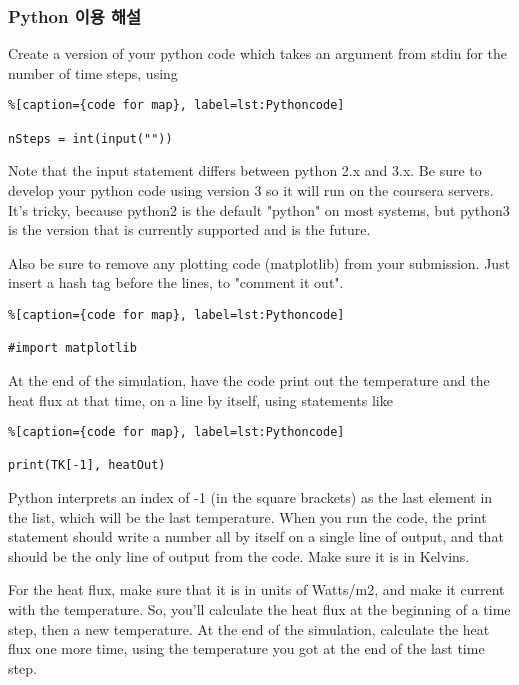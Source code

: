 \subsubsection{Python 이용 해설}\index{}

Create a version of your python code which takes an argument from stdin for the number of time steps, using

\begin{lstlisting}%[caption={code for map}, label=lst:Pythoncode]

nSteps = int(input(""))
\end{lstlisting}

Note that the input statement differs between python 2.x and 3.x. Be sure to develop your python code using version 3 so it will run on the coursera servers. It's tricky, because python2 is the default "python" on most systems, but python3 is the version that is currently supported and is the future.

Also be sure to remove any plotting code (matplotlib) from your submission. Just insert a hash tag before the lines, to "comment it out".

\begin{lstlisting}%[caption={code for map}, label=lst:Pythoncode]

#import matplotlib
\end{lstlisting}


At the end of the simulation, have the code print out the temperature and the heat flux at that time, on a line by itself, using statements like

\begin{lstlisting}%[caption={code for map}, label=lst:Pythoncode]

print(TK[-1], heatOut)
\end{lstlisting}

Python interprets an index of -1 (in the square brackets) as the last element in the list, which will be the last temperature. When you run the code, the print statement should write a number all by itself on a single line of output, and that should be the only line of output from the code. Make sure it is in Kelvins.

For the heat flux, make sure that it is in units of Watts/m2, and make it current with the temperature. So, you'll calculate the heat flux at the beginning of a time step, then a new temperature. At the end of the simulation, calculate the heat flux one more time, using the temperature you got at the end of the last time step.

